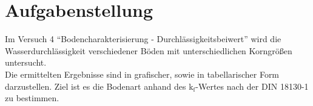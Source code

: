 \chapter{Aufgabenstellung}
\label{sec:aufgabenstellung}

Im Versuch 4 "`Bodencharakterisierung - Durchlässigkeitsbeiwert"' wird die Wasserdurchlässigkeit verschiedener Böden mit unterschiedlichen Korngrößen untersucht. \\
Die ermittelten Ergebnisse sind in grafischer, sowie in tabellarischer Form darzustellen. Ziel ist es die Bodenart anhand des $\text{k}_\text{f}$-Wertes nach der DIN 18130-1 zu bestimmen.
